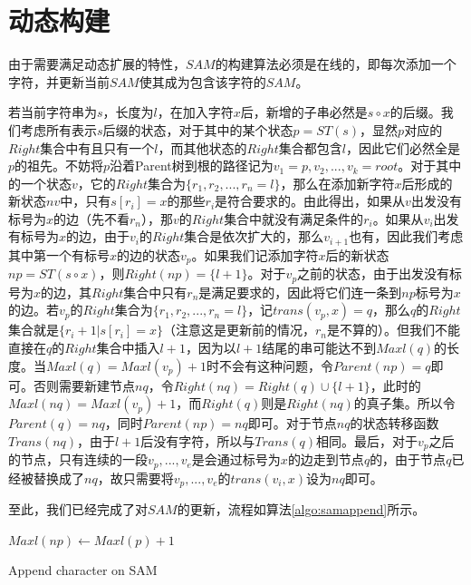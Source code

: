 ﻿\documentclass{sysuthesis}
\begin{document}
\section{动态构建}
由于需要满足动态扩展的特性，$SAM$的构建算法必须是在线的，即每次添加一个字符，并更新当前$SAM$使其成为包含该字符的$SAM$。\par
若当前字符串为$s$，长度为$l$，在加入字符$x$后，新增的子串必然是$s \circ x$的后缀。我们考虑所有表示$s$后缀的状态，对于其中的某个状态$p = ST(s)$，显然$p$对应的$Right$集合中有且只有一个$l$，而其他状态的$Right$集合都包含$l$，因此它们必然全是$p$的祖先。不妨将$p$沿着Parent树到根的路径记为$v_{1} = p, v_{2}, ... , v_{k} = root$。对于其中的一个状态$v$，它的$Right$集合为$\{r_{1}, r_{2}, ..., r_{n} = l\}$，那么在添加新字符$x$后形成的新状态$nv$中，只有$s[r_{i}] = x$的那些$r_{i}$是符合要求的。由此得出，如果从$v$出发没有标号为$x$的边（先不看$r_{n}$），那$v$的$Right$集合中就没有满足条件的$r_{i}$。如果从$v_{i}$出发有标号为$x$的边，由于$v_{i}$的$Right$集合是依次扩大的，那么$v_{i+1}$也有，因此我们考虑其中第一个有标号$x$的边的状态$v_{p}$。如果我们记添加字符$x$后的新状态$np = ST(s \circ x)$，则$Right(np) = \{l + 1\}$。对于$v_{p}$之前的状态，由于出发没有标号为$x$的边，其$Right$集合中只有$r_{n}$是满足要求的，因此将它们连一条到$np$标号为$x$的边。若$v_{p}$的$Right$集合为$\{r_{1}, r_{2}, ..., r_{n} = l\}$，记$trans(v_{p}, x) = q$，那么$q$的$Right$集合就是$\{r_{i} + 1 | s[r_{i}] = x\}$（注意这是更新前的情况，$r_{n}$是不算的）。但我们不能直接在$q$的$Right$集合中插入$l + 1$，因为以$l + 1$结尾的串可能达不到$Maxl(q)$的长度。当$Maxl(q) = Maxl(v_{p}) + 1$时不会有这种问题，令$Parent(np) = q$即可。否则需要新建节点$nq$，令$Right(nq) = Right(q) \cup \{l + 1\}$，此时的$Maxl(nq) = Maxl(v_{p}) + 1$，而$Right(q)$则是$Right(nq)$的真子集。所以令$Parent(q) = nq$，同时$Parent(np) = nq$即可。对于节点$nq$的状态转移函数$Trans(nq)$，由于$l + 1$后没有字符，所以与$Trans(q)$相同。最后，对于$v_{p}$之后的节点，只有连续的一段$v_{p}, ..., v_{e}$是会通过标号为$x$的边走到节点$q$的，由于节点$q$已经被替换成了$nq$，故只需要将$v_{p}, ..., v_{e}$的$trans(v_{i}, x)$设为$nq$即可。\par
至此，我们已经完成了对$SAM$的更新，流程如算法\ref{algo:samappend}所示。\par

\begin{algorithm}[H]
	$Maxl(np) \leftarrow Maxl(p) + 1$\;
	\caption{Append character on SAM}\label{algo:samappend}
\end{algorithm}
\end{document}
